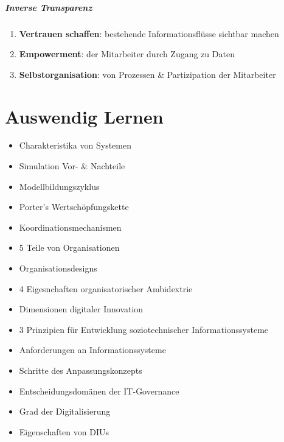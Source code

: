\documentclass{article}
\begin{document}
\subsubsection{Inverse Transparenz}
\begin{enumerate}
  \item \textbf{Vertrauen schaffen}: bestehende Informationsflüsse sichtbar machen
  \item \textbf{Empowerment}: der Mitarbeiter durch Zugang zu Daten
  \item \textbf{Selbstorganisation}: von Prozessen \& Partizipation der Mitarbeiter
\end{enumerate}

\part*{Auswendig Lernen}

\begin{itemize}
  \item Charakteristika von Systemen
  \item Simulation Vor- \& Nachteile
  \item Modellbildungszyklus
  \item Porter's Wertschöpfungskette
  \item Koordinationsmechanismen
  \item 5 Teile von Organisationen
  \item Organisationsdesigns
  \item 4 Eigesnchaften organisatorischer Ambidextrie
  \item Dimensionen digitaler Innovation
  \item 3 Prinzipien für Entwicklung soziotechnischer Informationssysteme
  \item Anforderungen an Informationssysteme
  \item Schritte des Anpassungskonzepts
  \item Entscheidungsdomänen der IT-Governance
  \item Grad der Digitalisierung
  \item Eigenschaften von DIUs
\end{itemize}
\end{document}

